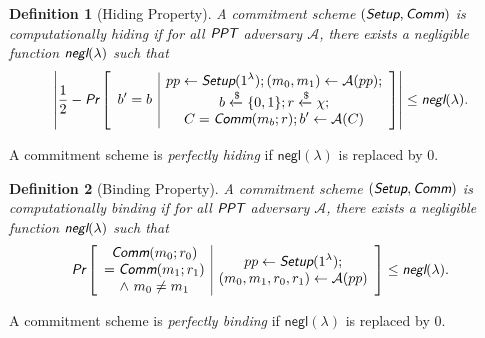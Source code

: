 \documentclass{article}
\theoremstyle{plain}
\newtheorem{definition}{Definition}[section]
\theoremstyle{remark}
\begin{document}
\begin{definition}[Hiding Property]
A commitment scheme $(\emph{\textsf{Setup}}, \emph{\textsf{Comm}})$ is computationally hiding if for all $\emph{\textsf{PPT}}$ adversary $\mathcal{A}$, there exists a negligible function $\emph{\textsf{negl}}(\lambda)$ such that
\begin{align*}
\left| \frac{1}{2} - \emph{\textsf{Pr}}\left[
\begin{array}{c|c}
    \begin{gathered}
        b' = b
    \end{gathered}
    &
    \begin{gathered}
        pp\leftarrow\emph{\textsf{Setup}}(1^{\lambda}); (m_0, m_1)\leftarrow\mathcal{A}(pp); \\
        b\xleftarrow{\$}\{0,1\}; r \xleftarrow{\$}\chi; \\
        C = \emph{\textsf{Comm}}(m_b; r); b'\leftarrow\mathcal{A}(C)
    \end{gathered}
\end{array}
\right]\right|
\le \emph{\textsf{negl}}(\lambda).
\end{align*}
\end{definition}
A commitment scheme is \textit{perfectly hiding} if $\textsf{negl}(\lambda)$ is replaced by $0$.

\begin{definition}[Binding Property]
A commitment scheme $(\emph{\textsf{Setup}}, \emph{\textsf{Comm}})$ is computationally binding if for all $\emph{\textsf{PPT}}$ adversary $\mathcal{A}$, there exists a negligible function $\emph{\textsf{negl}}(\lambda)$ such that
\begin{align*}
\emph{\textsf{Pr}}
\left[
\begin{array}{c|c}
    \begin{gathered}
         \emph{\textsf{Comm}}(m_0;r_0) \\
        = \emph{\textsf{Comm}}(m_1;r_1) \\
        \wedge\ m_0 \ne m_1
    \end{gathered}
    &
    \begin{gathered}
        pp\leftarrow\emph{\textsf{Setup}}(1^{\lambda}); \\
        (m_0,m_1,r_0,r_1)\leftarrow\mathcal{A}(pp)
    \end{gathered}
\end{array}
\right]
\le \emph{\textsf{negl}}(\lambda).
\end{align*}
\end{definition}
A commitment scheme is \textit{perfectly binding} if $\textsf{negl}(\lambda)$ is replaced by $0$.
\end{document}
